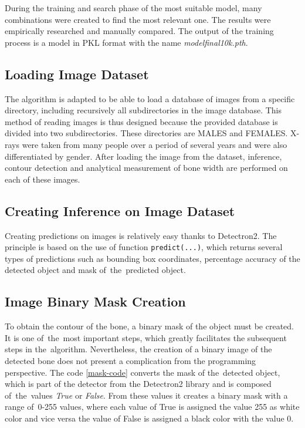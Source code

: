 During the training and search phase of the most suitable model, many combinations were created to find the most relevant one. The results were empirically researched and manually compared. The output of the training process is a model in PKL format with the name \textit{model\textunderscore final\textunderscore 10k.pth}.

\subsection{Loading Image Dataset}
The algorithm is adapted to be able to load a database of images from a specific directory, including recursively all subdirectories in the image database. This method of reading images is thus designed because the provided database is divided into two subdirectories. These directories are MALES and FEMALES. X-rays were taken from many people over a period of several years and were also differentiated by gender. After loading the image from the dataset, inference, contour detection and analytical measurement of bone width are performed on each of these images.

\subsection{Creating Inference on Image Dataset}
\label{inference}
Creating predictions on images is relatively easy thanks to Detectron2. The principle is based on the use of function \texttt{predict(...)}, which returns several types of predictions such as bounding box coordinates, percentage accuracy of the detected object and mask of~the~predicted object. 

\subsection{Image Binary Mask Creation}
To obtain the contour of the bone, a binary mask of the object must be created. It is one of~the~most important steps, which greatly facilitates the subsequent steps in the~algorithm. Nevertheless, the creation of a binary image of the detected bone does not present a complication from the programming perspective. The code \ref{mask-code}  converts the mask of the~detected object, which is part of the detector from the Detectron2 library and is composed of~the~values \textit{True} or \textit{False}. From these values it creates a binary mask with a range of~0-255 values, where each value of True is assigned the value 255 as white color and vice versa the value of False is assigned a black color with the value 0.

